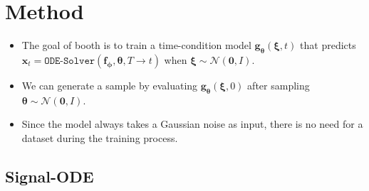 \documentclass[10pt]{article}
\newcommand{\ve}[1]{\mathbf{#1}}
\newcommand{\ves}[1]{\boldsymbol{#1}}
\newcommand{\mcal}[1]{\mathcal{#1}}
\begin{document}
\section{Method}

\begin{itemize}
  \item The goal of booth is to train a time-condition model $\ve{g}_{\ves{\theta}}(\ves{\xi}, t)$ that predicts $\ve{x}_t = \texttt{ODE-Solver}(\ve{f}_{\ves{\phi}}, \ves{\theta}, T \rightarrow t)$ when $\ves{\xi} \sim \mcal{N}(\ve{0},I)$.
  
  \item We can generate a sample by evaluating $\ve{g}_{\ves{\theta}}(\ves{\xi}, 0)$ after sampling $\ves{\theta} \sim \mcal{N}(\ve{0},I)$.
  
  \item Since the model always takes a Gaussian noise as input, there is no need for a dataset during the training process.
\end{itemize}

\subsection{Signal-ODE}
\end{document}
